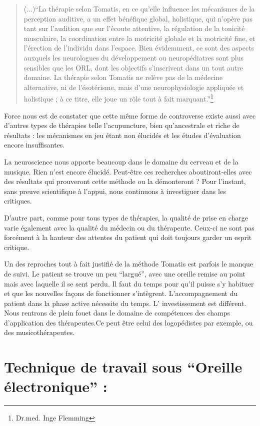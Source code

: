\begin{quotation}
(...)``La thérapie selon Tomatis, en ce qu'elle influence les mécanismes
de la perception auditive, a un effet bénéfique global, holistique,
qui n'opère pas tant sur l'audition que sur l'écoute attentive, la
régulation de la tonicité musculaire, la coordination entre la motricité
globale et la motricité fine, et l'érection de l'individu dans l'espace.
Bien évidemment, ce sont des aspects auxquels les neurologues du développement
ou neuropédiatres sont plus sensibles que les ORL, dont les objectifs
s'inscrivent dans un tout autre domaine. La thérapie selon Tomatis
ne relève pas de la médecine alternative, ni de l'ésotérisme, mais
d'une neurophysiologie appliquée et holistique ; à ce titre, elle
joue un rôle tout à fait marquant.''\footnote{Dr.med. Inge Flemming}
\end{quotation}
Force nous est de constater que cette même forme de controverse existe
aussi avec d'autres types de thérapies telle l'acupuncture, bien qu'ancestrale
et riche de résultats : les mécanismes en jeu étant non élucidés et
les études d'évaluation encore insuffisantes. 

La neuroscience nous apporte beaucoup dans le domaine du cerveau et
de la musique. Rien n'est encore élucidé. Peut-être ces recherches
aboutiront-elles avec des résultats qui prouveront cette méthode ou
la démonteront ? Pour l'instant, sans preuve scientifique à l'appui,
nous continuons à investiguer dans les critiques.

D'autre part, comme pour tous types de thérapies, la qualité de prise
en charge varie également avec la qualité du médecin ou du thérapeute.
Ceux-ci ne sont pas forcément à la hauteur des attentes du patient
qui doit toujours garder un esprit critique.

Un des reproches tout à fait justifié de la méthode Tomatis est parfois
le manque de suivi. Le patient se trouve un peu ``largué'', avec
une oreille remise au point mais avec laquelle il se sent perdu. Il
faut du temps pour qu'il puisse s'y habituer et que les nouvelles
façons de fonctionner s'intègrent. L'accompagnement du patient dans
la phase active nécessite du temps. L' investissement est différent.
Nous rentrons de plein fouet dans le domaine de compétences des champs
d'application des thérapeutes.Ce peut être celui des logopédistes
par exemple, ou des musicothérapeutes.

\section{Technique de travail sous ``Oreille électronique'' :}

